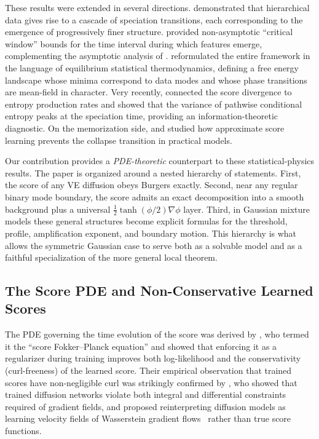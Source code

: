 \documentclass[11pt]{article}
\begin{document}
These results were extended in several directions.
\citet{sclocchi2024phase} demonstrated that hierarchical data gives rise to a cascade of speciation transitions, each corresponding to the emergence of progressively finer structure.
\citet{li2024critical} provided non-asymptotic ``critical window'' bounds for the time interval during which features emerge, complementing the asymptotic analysis of \citet{biroli2024dynamical}.
\citet{ambrogioni2025thermodynamics} reformulated the entire framework in the language of equilibrium statistical thermodynamics, defining a free energy landscape whose minima correspond to data modes and whose phase transitions are mean-field in character.
Very recently, \citet{ambrogioni2025information} connected the score divergence to entropy production rates and showed that the variance of pathwise conditional entropy peaks at the speciation time, providing an information-theoretic diagnostic.
On the memorization side, \citet{bonnaire2025memorization} and \citet{achilli2025memorization} studied how approximate score learning prevents the collapse transition in practical models.

Our contribution provides a \emph{PDE-theoretic} counterpart to these statistical-physics results.
The paper is organized around a nested hierarchy of statements. First, the score of any VE diffusion obeys Burgers exactly. Second, near any regular binary mode boundary, the score admits an exact decomposition into a smooth background plus a universal $\tfrac{1}{2}\tanh(\phi/2)\nabla\phi$ layer. Third, in Gaussian mixture models these general structures become explicit formulas for the threshold, profile, amplification exponent, and boundary motion.
This hierarchy is what allows the symmetric Gaussian case to serve both as a solvable model and as a faithful specialization of the more general local theorem.

\subsection{The Score PDE and Non-Conservative Learned Scores}

The PDE governing the time evolution of the score was derived by \citet{lai2023fp}, who termed it the ``score Fokker--Planck equation'' and showed that enforcing it as a regularizer during training improves both log-likelihood and the conservativity (curl-freeness) of the learned score.
Their empirical observation that trained scores have non-negligible curl was strikingly confirmed by \citet{vuong2025score}, who showed that trained diffusion networks violate both integral and differential constraints required of gradient fields, and proposed reinterpreting diffusion models as learning velocity fields of Wasserstein gradient flows~\citep{jordan1998variational, ambrosio2005gradient} rather than true score functions.
\end{document}
